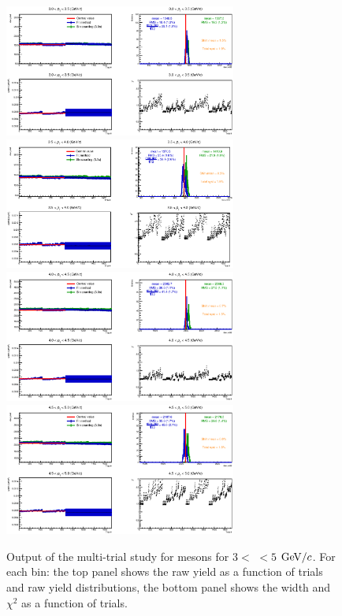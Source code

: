 \begin{figure}[!h]
\begin{center}
\includegraphics[width=0.68\textwidth]{figures/Dstar/pp13TeV/multi_trial/MultiFit_bkg5_3-3.eps}
\includegraphics[width=0.68\textwidth]{figures/Dstar/pp13TeV/multi_trial/MultiFit_bkg5_3-4.eps}
\includegraphics[width=0.68\textwidth]{figures/Dstar/pp13TeV/multi_trial/MultiFit_bkg5_4-4.eps}
\includegraphics[width=0.68\textwidth]{figures/Dstar/pp13TeV/multi_trial/MultiFit_bkg5_4-5.eps}
\caption{Output of the multi-trial study for \Dstar mesons for $3<$ \pt$<5$ ${\rm GeV}/c$. For each \pt bin: the top panel shows the raw yield as a function of trials and raw yield distributions, the bottom panel shows the width and $\chi^2$ as a function of trials.}
\label{fig:DstarYieldSyst010_2}
\end{center}
\end{figure}

